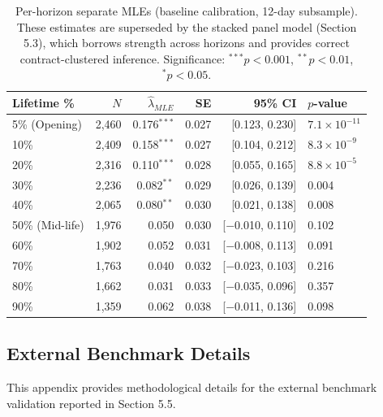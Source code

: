 \documentclass[12pt,a4paper]{article}
\begin{document}
\begin{table}[H]
\centering
\small
\caption{Per-horizon separate MLEs (baseline calibration, 12-day subsample). These estimates are superseded by the stacked panel model (Section 5.3), which borrows strength across horizons and provides correct contract-clustered inference. Significance: $^{***}p<0.001$, $^{**}p<0.01$, $^{*}p<0.05$.}
\label{tab:horizons_appendix}
\begin{tabular}{lrrrrl}
\toprule
Lifetime \% & $N$ & $\hat{\lambda}_{MLE}$ & SE & 95\% CI & $p$-value \\
\midrule
5\% (Opening) & 2,460 & 0.176$^{***}$ & 0.027 & [0.123, 0.230] & $7.1 \times 10^{-11}$ \\
10\% & 2,409 & 0.158$^{***}$ & 0.027 & [0.104, 0.212] & $8.3 \times 10^{-9}$ \\
20\% & 2,316 & 0.110$^{***}$ & 0.028 & [0.055, 0.165] & $8.8 \times 10^{-5}$ \\
30\% & 2,236 & 0.082$^{**}$ & 0.029 & [0.026, 0.139] & 0.004 \\
40\% & 2,065 & 0.080$^{**}$ & 0.030 & [0.021, 0.138] & 0.008 \\
50\% (Mid-life) & 1,976 & 0.050 & 0.030 & [$-$0.010, 0.110] & 0.102 \\
60\% & 1,902 & 0.052 & 0.031 & [$-$0.008, 0.113] & 0.091 \\
70\% & 1,763 & 0.040 & 0.032 & [$-$0.023, 0.103] & 0.216 \\
80\% & 1,662 & 0.031 & 0.033 & [$-$0.035, 0.096] & 0.357 \\
90\% & 1,359 & 0.062 & 0.038 & [$-$0.011, 0.136] & 0.098 \\
\bottomrule
\end{tabular}
\end{table}









\subsection{External Benchmark
Details}\label{b.-external-benchmark-details}

This appendix provides methodological details for the external benchmark
validation reported in Section 5.5.
\end{document}
